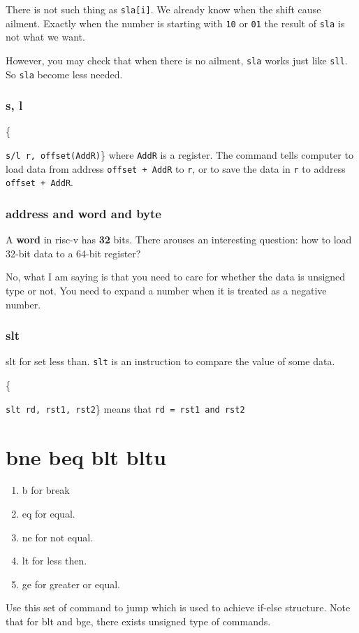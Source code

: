 \documentclass[11pt]{article}
\begin{document}
There is not such thing as \texttt{sla[i]}. We already know when the shift cause ailment. Exactly when the number is starting with \texttt{10} or \texttt{01} the result of \texttt{sla} is not what we want. 

However, you may check that when there is no ailment, \texttt{sla} works just like \texttt{sll}. So \texttt{sla} become less needed. 
\subsubsection{s, l}
\centerline\{\texttt{s/l r, offset(AddR)}\}
where \texttt{AddR} is a register. The command tells computer to load data from address \texttt{offset + AddR} to \texttt{r}, or to save the data in \texttt{r} to address \texttt{offset + AddR}.
\subsubsection{address and word and byte}
A \textbf{word} in risc-v has \textbf{32} bits. There arouses an interesting question: how to load 32-bit data to a 64-bit register? 

No, what I am saying is that you need to care for whether the data is unsigned type or not. You need to expand a number when it is treated as a negative number. 
\subsubsection{slt}
slt for set less than. \texttt{slt} is an instruction to compare the value of some data. 

\centerline\{\texttt{slt rd, rst1, rst2}\} 
means that \texttt{rd = rst1 and rst2}


\section{bne beq blt bltu}
\label{sec:orgaa3fe03}
\begin{enumerate}
\item b for break
\item eq for equal.
\item ne for not equal. 
\item lt for less then.
\item ge for greater or equal.
\end{enumerate}
Use this set of command to jump which is used to achieve if-else structure. Note that for blt and bge, there exists unsigned type of commands. 
\end{document}
